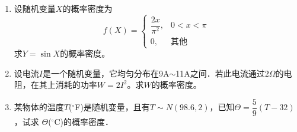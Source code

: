 \begin{enumerate}
    \item 设随机变量$X$的概率密度为
    $$f(X)=\left\{\begin{array}{ll}
        \dfrac{2x}{\pi ^2}, & 0<x <\pi\\
        0, & \mbox{其他}
    \end{array}\right.$$
    求$Y=\sin X$的概率密度。


    \item 设电流$I$是一个随机变量，它均匀分布在9A$\sim$11A之间．若此电流通过$2\Omega$的电
    阻，在其上消耗的功率$W=2I^2$。求$W$的概率密度。


    \item 某物体的温度$T$($^{\circ}$F)是随机变量，且有$T\sim N(98.6,2)$，已知$\varTheta =\dfrac{5}{9}(T-32)$，试求
    $\varTheta$($^{\circ}$C)的概率密度．

    
    


    

\end{enumerate}
